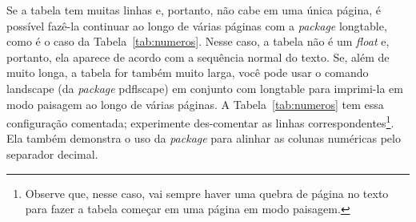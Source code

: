 Se a tabela tem muitas linhas e, portanto, não cabe em uma única página, é
possível fazê-la continuar ao longo de várias páginas com a \textit{package}
\textsf{longtable}, como é o caso da Tabela~\ref{tab:numeros}. Nesse caso,
a tabela não é um \textit{float} e, portanto, ela aparece de acordo com a
sequência normal do texto. Se, além de muito longa, a tabela for também
muito larga, você pode usar o comando \textsf{landscape} (da
\textit{package} \textsf{pdflscape}) em conjunto com \textsf{longtable}
para imprimi-la em modo paisagem ao longo de várias páginas. A
Tabela~\ref{tab:numeros} tem essa configuração comentada; experimente
des-comentar as linhas correspondentes\footnote{Observe que, nesse caso,
vai sempre haver uma quebra de página no texto para fazer a tabela
começar em uma página em modo paisagem.}. Ela também demonstra o uso
da \emph{package}  para alinhar as colunas numéricas pelo
separador decimal.


\bgroup
{}

